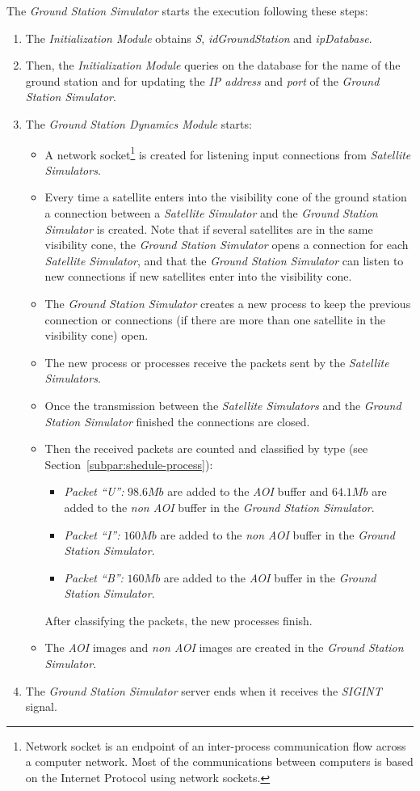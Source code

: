 The \emph{Ground Station Simulator} starts the execution following these steps:
\begin{enumerate} 
\item The \emph{Initialization Module} obtains \emph{S}, \emph{idGroundStation} and \emph{ipDatabase}.
\item Then, the \emph{Initialization Module} queries on the database for the
  name of the ground station and for updating the \emph{IP address} and
  \emph{port} of the \emph{Ground Station Simulator}.
\item The \emph{Ground Station Dynamics Module} starts:
\begin{itemize}
\item A network socket\footnote{Network socket is an endpoint of an inter-process communication flow across a computer network. Most of the communications between computers is based on the Internet Protocol using network sockets.}  is created for listening input connections from \emph{Satellite Simulators}.
\item Every time a satellite enters into the visibility cone of the ground station a connection between a \emph{Satellite Simulator} and the \emph{Ground Station Simulator} is created. Note that if several satellites are in the same visibility cone, the \emph{Ground Station Simulator} opens a connection for each \emph{Satellite Simulator}, and that the \emph{Ground Station Simulator} can listen to new connections if new satellites enter into the visibility cone.
\item The \emph{Ground Station Simulator} creates a new process to keep the previous connection or connections (if there are more than one satellite in the visibility cone) open. 
\item The new process or processes receive the packets sent by the \emph{Satellite Simulators}.
\item Once the transmission between the \emph{Satellite Simulators} and the \emph{Ground Station Simulator} finished the connections are closed.
\item Then the received packets are counted and classified by type (see Section~\ref{subpar:shedule-process}):
\begin{itemize}
\item \emph{Packet ``U'':} $98.6Mb$ are added to the \emph{AOI} buffer and $64.1Mb$ are added to the \emph{non AOI} buffer in the \emph{Ground Station Simulator}. 
\item \emph{Packet ``I'':} $160 Mb$ are added to the \emph{non AOI} buffer in the \emph{Ground Station Simulator}. 
\item \emph{Packet ``B'':} $160 Mb$ are added to the \emph{AOI} buffer in the
  \emph{Ground   Station Simulator}.
\end{itemize}
After classifying the packets, the new processes finish. 
\item The \emph{AOI} images and \emph{non AOI} images are created in the \emph{Ground Station  Simulator}.
\end{itemize}
\item The \emph{Ground Station Simulator} server ends when it receives the \emph{SIGINT} signal. 
\end{enumerate}

